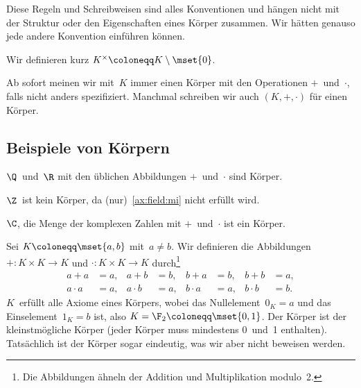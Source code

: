 \documentclass[a4paper]{article}
\begin{document}
Diese Regeln und Schreibweisen sind alles Konventionen und hängen nicht mit der Struktur oder den Eigenschaften eines Körper zusammen. Wir hätten genauso jede andere Konvention einführen können.

\begin{notation}
    Wir definieren kurz $K^\times \coloneqq K \setminus \mset{0}$.
\end{notation}

Ab sofort meinen wir mit~$K$ immer einen Körper mit den Operationen $+$~und~$\cdot$, falls nicht anders spezifiziert. Manchmal schreiben wir auch $(K, +, \cdot)$ für einen Körper.

\subsection{Beispiele von Körpern}

\begin{example}
    $\Q$~und~$\R$ mit den üblichen Abbildungen $+$~und~$\cdot$ sind Körper.
\end{example}

\begin{example}
    $\Z$~ist kein Körper, da (nur)~\ref{ax:field:mi} nicht erfüllt wird.
\end{example}

\begin{example}
    $\C$, die Menge der komplexen Zahlen mit $+$~und~$\cdot$ ist ein Körper.
\end{example}

\begin{example}
    Sei $K \coloneqq \mset{a, b}$ mit~$a \neq b$. Wir definieren die Abbildungen $+\colon K \times K \to K$ und $\cdot\colon K \times K \to K$ durch\footnote{Die Abbildungen ähneln der Addition und Multiplikation modulo~2.}
    \begin{align*}
        a + a &= a, & a + b &= b, & b + a &= b, & b + b &= a, \\
        a \cdot a &= a, & a \cdot b &= a, & b \cdot a &= a, & b \cdot b &= b.
    \end{align*}
    $K$~erfüllt alle Axiome eines Körpers, wobei das Nullelement~$0_K = a$ und das Einselement~$1_K = b$ ist, also $K = \F_2 \coloneqq \mset{0, 1}$. Der Körper ist der kleinstmögliche Körper (jeder Körper muss mindestens 0~und~1 enthalten). Tatsächlich ist der Körper sogar eindeutig, was wir aber nicht beweisen werden.
\end{example}
\end{document}

